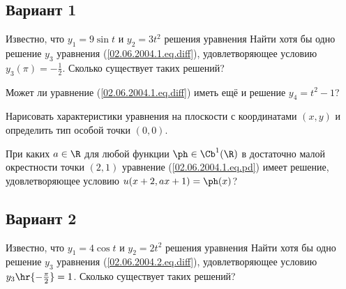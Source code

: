 \documentclass{article}
\begin{document}
\subsection{Вариант 1}

\begin{problem}[3 балла]
Известно, что $y_1=9\sin t$ и $y_2 = 3t^2$ решения уравнения
Найти хотя бы одно решение $y_3$ уравнения (\ref{02.06.2004.1.eq.diff}), удовлетворяющее
условию $y_3(\pi) = -\frac12$. Сколько существует таких решений?
\end{problem}

\begin{problem}[2 балла]
Может ли уравнение (\ref{02.06.2004.1.eq.diff}) иметь ещё и решение $y_4 = t^2 -1$?
\end{problem}

\begin{problem}[2 балла]
Нарисовать характеристики уравнения
на плоскости с координатами $(x,y)$ и определить тип особой точки $(0,0)$.
\end{problem}

\begin{problem}[3 балла]
При каких $a \in \R$ для любой функции $\ph \in  \Cb^1(\R)$ в достаточно малой
окрестности точки $(2,1)$ уравнение (\ref{02.06.2004.1.eq.pd}) имеет решение, удовлетворяющее
условию $u(x+2,ax+1) = \ph(x)$?
\end{problem}

\setcounter{problem}{0}
\subsection{Вариант 2}

\begin{problem}[3 балла]
Известно, что $y_1=4\cos t$ и $y_2 = 2t^2$ решения уравнения
Найти хотя бы одно решение $y_3$ уравнения (\ref{02.06.2004.2.eq.diff}), удовлетворяющее
условию $y_3\hr{-\frac\pi2} = 1$. Сколько существует таких решений?
\end{problem}
\end{document}
